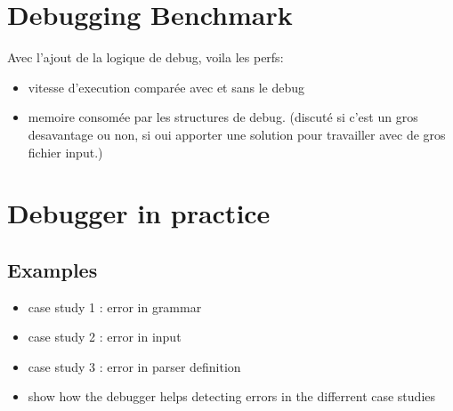 \section{Debugging Benchmark}
Avec l'ajout de la logique de debug, voila les perfs:

\begin{itemize}
	\item vitesse d'execution comparée avec et sans le debug
	\item memoire consomée par les structures de debug. (discuté si c'est un gros desavantage ou non, si oui apporter une solution pour travailler avec de gros fichier input.)
\end{itemize}



	\section{Debugger in practice}

	\subsection{Examples}

	\begin{itemize}
		\item case study 1 : error in grammar
		\item case study 2 : error in input
		\item case study 3 : error in parser definition
		\item show how the debugger helps detecting errors in the differrent case studies
	\end{itemize}